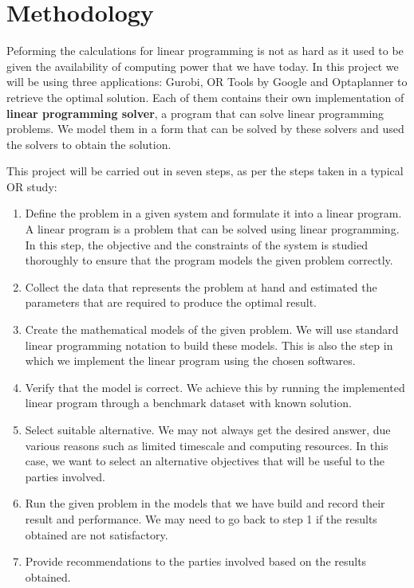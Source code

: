 \documentclass[a4paper, 12pt]{report}
\begin{document}
\section{Methodology}
Peforming the calculations for linear programming is not as hard as it used to be given the availability of computing power that we have today.
In this project we will be using three applications: Gurobi, OR Tools by Google and Optaplanner to retrieve the optimal solution. Each of them
contains their own implementation of \textbf{linear programming solver}, a program that can solve linear programming problems. We model them
in a form that can be solved by these solvers and used the solvers to obtain the solution.

This project will be carried out in seven steps, as per the steps taken in a typical OR study:

\begin{enumerate}
\item Define the problem in a given system and formulate it into a linear program. A linear program is a problem that can be solved
using linear programming. In this step, the objective and the constraints of the system is studied thoroughly to ensure
that the program models the given problem correctly.
\item Collect the data that represents the problem at hand and estimated the parameters that are required to produce
the optimal result.
\item Create the mathematical models of the given problem. We will use standard linear programming notation to build these models. This is
also the step in which we implement the linear program using the chosen softwares.
\item Verify that the model is correct. We achieve this by running the implemented linear program through a benchmark dataset with known solution.
\item Select suitable alternative. We may not always get the desired answer, due various reasons such as limited timescale and computing resources.
In this case, we want to select an alternative objectives that will be useful to the parties involved.
\item Run the given problem in the models that we have build and record their result and performance. We may need to go back to step 1 if the results obtained
are not satisfactory.
\item Provide recommendations to the parties involved based on the results obtained.
\end{enumerate}
\end{document}
